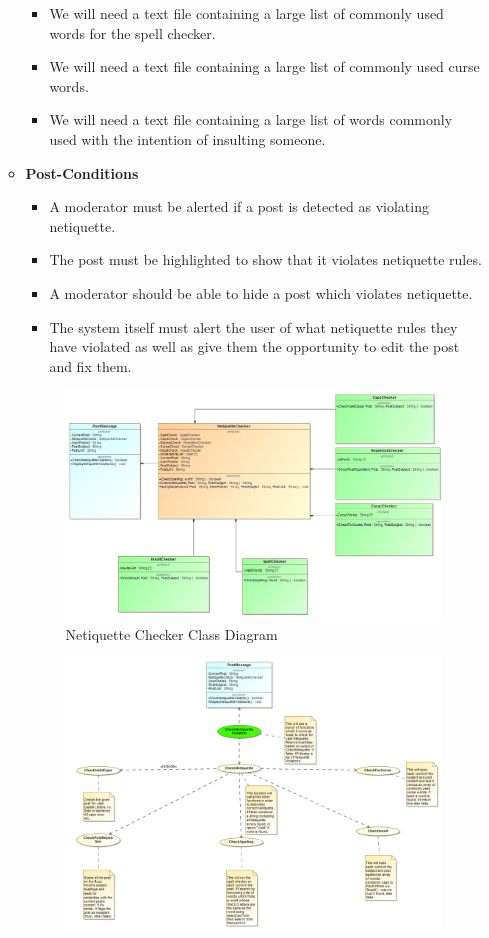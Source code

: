 \documentclass[11pt]{article}
\begin{document}
\begin{enumerate}
\begin{itemize}
\begin{itemize}
	  		\item We will need a text file containing a large list of commonly used words for the spell checker.
	  		\item We will need a text file containing a large list of commonly used curse words.
			\item We will need a text file containing a large list of words commonly used with the intention of insulting someone.
  		\end{itemize}
  	\item	\textbf{Post-Conditions}
  		\begin{itemize}
	  		\item A moderator must be alerted if a post is detected as violating netiquette.
	  		\item The post must be highlighted to show that it violates netiquette rules.
	  		\item A moderator should be able to hide a post which violates netiquette.
	  		\item The system itself must alert the user of what netiquette rules they have violated as well as give them the opportunity to edit the post and fix them.
	  	\end{itemize}
	  		\begin{figure}[H]
	  			\includegraphics[scale=0.35,center]{NetInputOutput.jpg}
	  			\caption{Netiquette Checker Class Diagram}
	  		\end{figure}
	  		\begin{figure}[H]
	  			\includegraphics[scale=0.35,center]{NetUseCase.jpg}

\end{figure}
\end{itemize}
\end{enumerate}
\end{document}
